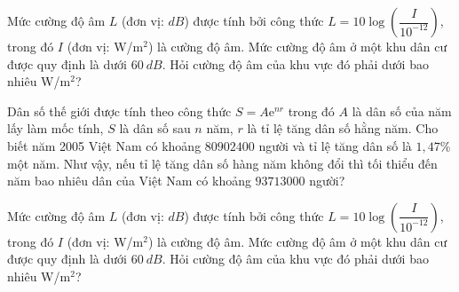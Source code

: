 \begin{bt}%
	Mức cường độ âm $L$ (đơn vị: $dB$) được tính bởi công thức $L=10\log\left(\dfrac{I}{10^{-12}}\right)$, trong đó $I$ (đơn vị: W/m$^2$) là cường độ âm. Mức cường độ âm ở một  khu dân cư được quy định là dưới $60\ dB$. Hỏi cường độ âm của khu vực đó phải dưới bao nhiêu W/m$^2$?
\end{bt}

\begin{bt}%
	Dân số thế giới được tính theo công thức $S=A\mathrm{e}^{nr}$ trong đó $A$ là dân số của năm lấy làm mốc tính, $S$ là dân số sau $n$ năm, $r$ là tỉ lệ tăng dân số hằng năm. Cho biết năm 2005 Việt Nam có khoảng $80902400$ người và tỉ lệ tăng dân số là $1,47\%$ một năm. Như vậy, nếu tỉ lệ tăng  dân số hàng năm không đổi thì tối thiểu đến năm bao nhiêu dân của Việt Nam có khoảng $93713000$ người?
\end{bt}

\begin{ex}%
	Mức cường độ âm $L$ (đơn vị: $dB$) được tính bởi công thức $L=10\log\left(\dfrac{I}{10^{-12}}\right)$, trong đó $I$ (đơn vị: W/m$^2$) là cường độ âm. Mức cường độ âm ở một khu dân cư được quy định  là dưới $60\ dB$. Hỏi cường độ âm của khu vực đó phải dưới bao nhiêu W/m$^2$?
\end{ex}

